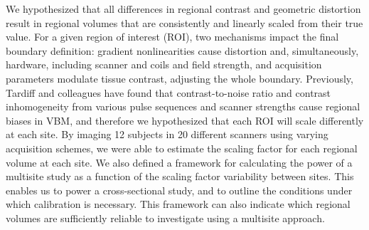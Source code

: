 We hypothesized that all differences in regional contrast and geometric distortion result in regional volumes that are consistently and linearly scaled from their true value. For a given region of interest (ROI), two mechanisms impact the final boundary definition: gradient nonlinearities cause distortion and, simultaneously, hardware, including scanner and coils and field strength, and acquisition parameters modulate tissue contrast, adjusting the whole boundary. Previously, Tardiff and colleagues have found that contrast-to-noise ratio and contrast inhomogeneity from various pulse sequences and scanner strengths cause regional biases in VBM\cite{tardif2010regional, tardif2009sensitivity}, and therefore we hypothesized that each ROI will scale differently at each site. By imaging 12 subjects in 20 different scanners using varying acquisition schemes, we were able to estimate the scaling factor for each regional volume at each site. We also defined a framework for calculating the power of a multisite study as a function of the scaling factor variability between sites. This enables us to power a cross-sectional study, and to outline the conditions under which calibration is necessary. This framework can also indicate which regional volumes are sufficiently reliable to investigate using a multisite approach.